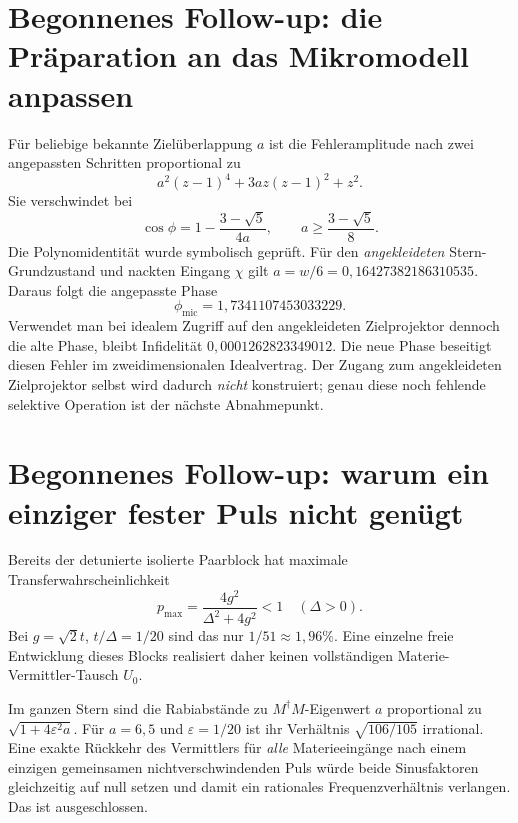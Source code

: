 \section{Begonnenes Follow-up: die Präparation an das Mikromodell anpassen}
Für beliebige bekannte Zielüberlappung $a$ ist die Fehleramplitude nach zwei angepassten Schritten proportional zu
\begin{equation}
a^2(z-1)^4+3az(z-1)^2+z^2.
\end{equation}
Sie verschwindet bei
\begin{equation}
\cos\phi=1-\frac{3-\sqrt5}{4a},\qquad
a\ge\frac{3-\sqrt5}{8}.
\label{eq:matched-general}
\end{equation}
Die Polynomidentität wurde symbolisch geprüft. Für den \emph{angekleideten} Stern-Grundzustand und nackten Eingang $\chi$ gilt $a=w/6=0{,}16427382186310535$. Daraus folgt die angepasste Phase
\begin{equation}
\phi_{\mathrm{mic}}=1{,}7341107453033229.
\end{equation}
Verwendet man bei idealem Zugriff auf den angekleideten Zielprojektor dennoch die alte Phase, bleibt Infidelität $0{,}0001262823349012$. Die neue Phase beseitigt diesen Fehler im zweidimensionalen Idealvertrag. Der Zugang zum angekleideten Zielprojektor selbst wird dadurch \emph{nicht} konstruiert; genau diese noch fehlende selektive Operation ist der nächste Abnahmepunkt.

\section{Begonnenes Follow-up: warum ein einziger fester Puls nicht genügt}
Bereits der detunierte isolierte Paarblock hat maximale Transferwahrscheinlichkeit
\begin{equation}
p_{\max}=\frac{4g^2}{\Delta^2+4g^2}<1\quad(\Delta>0).
\end{equation}
Bei $g=\sqrt2t$, $t/\Delta=1/20$ sind das nur $1/51\approx1{,}96\%$. Eine einzelne freie Entwicklung dieses Blocks realisiert daher keinen vollständigen Materie-Vermittler-Tausch $U_0$.

Im ganzen Stern sind die Rabiabstände zu $M^\dagger M$-Eigenwert $a$ proportional zu $\sqrt{1+4\varepsilon^2a}$. Für $a=6,5$ und $\varepsilon=1/20$ ist ihr Verhältnis $\sqrt{106/105}$ irrational. Eine exakte Rückkehr des Vermittlers für \emph{alle} Materieeingänge nach einem einzigen gemeinsamen nichtverschwindenden Puls würde beide Sinusfaktoren gleichzeitig auf null setzen und damit ein rationales Frequenzverhältnis verlangen. Das ist ausgeschlossen.

